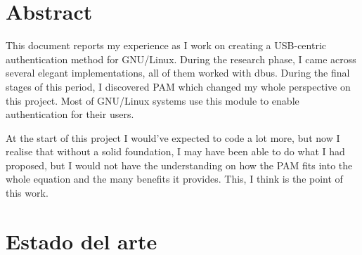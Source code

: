 \documentclass[titlepage, 12pt, a4paper]{article}
\begin{document}
\section*{Abstract}
This document reports my experience as I work on creating a USB-centric authentication method for \Gls{GNU/Linux}. During the research phase, I came across several elegant implementations, all of them worked with \Gls{dbus}. During the final stages of this period, I discovered \Gls{PAM} which changed my whole perspective on this project. Most of \Gls{GNU/Linux} systems use this module to enable authentication for their users.\par At the start of this project I would've expected to code a lot more, but now I realise that without a solid foundation, I may have been able to do what I had proposed, but I would not have the understanding on how the \Gls{PAM} fits into the whole equation and the many benefits it provides. This, I think is the point of this work.
\clearpage
\tableofcontents
\clearpage
\listoffigures
\clearpage
\printglossary[title={Abreviaciones y tecnicismos}]
\clearpage
\section{Estado del arte}
\end{document}
